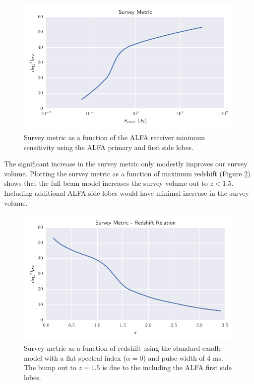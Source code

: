 \documentclass[a4paper,fleqn,usenatbib]{mnras}
\begin{document}
\begin{figure}
    \includegraphics[width=1.0\linewidth]{figures/full_survey_metric_sense.pdf}
    \caption{Survey metric as a function of the ALFA receiver minimum
    sensitivity using the ALFA primary and first side lobes.
    }
    \label{fig:survey_metric_sense}
\end{figure}

The significant increase in the survey metric only modestly improves our survey
volume. Plotting the survey metric as a function of maximum redshift (Figure
\ref{fig:full_sefd_z}) shows that the full beam model increases the survey
volume out to $z<1.5$. Including additional ALFA side lobes would have minimal
increase in the survey volume.

\begin{figure}
    \includegraphics[width=1.0\linewidth]{figures/full_sefd_z_relation.pdf}
    \caption{Survey metric as a function of redshift using the standard candle
    model with a flat spectral index ($\alpha=0$) and pulse width of 4 ms. The
    bump out to $z=1.5$ is due to the including the ALFA first side lobes.
    }
    \label{fig:full_sefd_z}
\end{figure}
\end{document}
